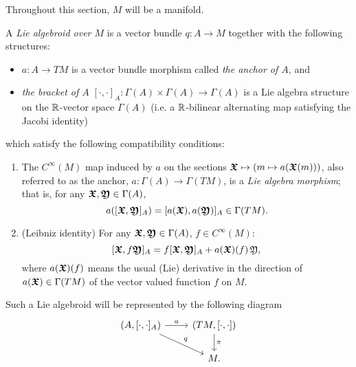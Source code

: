 Throughout this section, $M$ will be a manifold.

\begin{definition} \label{defnLieAlgoid}
A \emph{Lie algebroid over $M$} is a vector bundle $q:A\to M$  together with the following structures:
    \begin{itemize}
    
    \item $a:A \to TM$ is a vector bundle morphism called \emph{the anchor of $A$}, and
    
    \item \emph{the bracket of $A$} $[\cdot, \cdot ]_A: \Gamma(A) \times \Gamma(A) \to \Gamma(A)$ is a Lie algebra structure on the $\mathbb{R}$-vector space $\Gamma(A)$ (i.e. a $\mathbb{R}$-bilinear alternating map satisfying the Jacobi identity)
 
    \end{itemize}  
which satisfy the following compatibility conditions:
    \begin{enumerate}
    
    \item The $C^\infty(M)$ map induced by $a$ on the sections $\bm{\mathfrak{X}} \mapsto (m \mapsto a(\bm{\mathfrak{X}}(m)))$, also referred to as the anchor, $a:\Gamma(A) \to \Gamma(TM)$, is a \emph{Lie algebra morphism}; that is, for any $\bm{\mathfrak{X}}, \bm{\mathfrak{Y}} \in \Gamma(A)$,
    \[ a([\bm{\mathfrak{X}}, \bm{\mathfrak{Y}}]_A)  = [a(\bm{\mathfrak{X}}), a(\bm{\mathfrak{Y}})]_A \in  \Gamma(TM).\]
    
    \item (Leibniz identity) For any $\bm{\mathfrak{X}}, \bm{\mathfrak{Y}} \in \Gamma(A)$, $f \in C^\infty (M)$: 
    \[ [\bm{\mathfrak{X}}, f\bm{\mathfrak{Y}}]_A = f[\bm{\mathfrak{X}}, \bm{\mathfrak{Y}}]_A + a(\bm{\mathfrak{X}})(f)\, \mathfrak{Y}, \] 
    where $a(\bm{\mathfrak{X}})(f)$ means the usual (Lie) derivative in the direction of $a(\bm{\mathfrak{X}}) \in \Gamma(TM)$ of the vector valued function $f$ on $M$.
    
    \end{enumerate}
Such a Lie algebroid will be represented by the following diagram
\begin{equation}
    \begin{tikzcd}
    (A, [\cdot, \cdot]_A) \arrow{r}{a} \arrow{dr}{q} & (TM, [\cdot, \cdot]) \arrow{d}{\pi}\\
    & M.
    \end{tikzcd}
\end{equation}
\end{definition}



